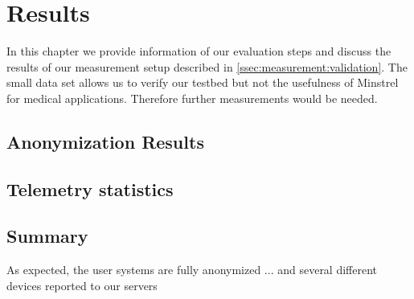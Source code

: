 \chapter{Results}
\label{chap:results}
In this chapter we provide information of our evaluation steps and discuss the results of our measurement setup described in \ref{ssec:measurement:validation}.
The small data set allows us to verify our testbed but not the usefulness of Minstrel for medical applications. Therefore further measurements would be needed.\\


\section{Anonymization Results}
\label{sec:results:anon}
%




\section{Telemetry statistics}
\label{sec:results:telemetry}
%




\section{Summary}
As expected, the user systems are fully anonymized ... and several different devices reported to our servers

